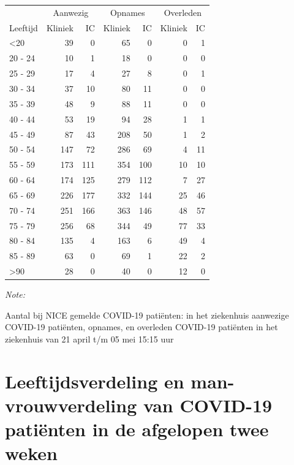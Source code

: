 \documentclass[
  english,
  man,floatsintext]{apa6}
\begin{document}
\begin{table}
\centering\begingroup\fontsize{10}{12}\selectfont

\begin{threeparttable}
\begin{tabular}{lrrrrrr}
\toprule
\multicolumn{1}{c}{ } & \multicolumn{2}{c}{Aanwezig} & \multicolumn{2}{c}{Opnames} & \multicolumn{2}{c}{Overleden} \\
\cmidrule(l{3pt}r{3pt}){2-3} \cmidrule(l{3pt}r{3pt}){4-5} \cmidrule(l{3pt}r{3pt}){6-7}
Leeftijd & Kliniek & IC & Kliniek & IC & Kliniek & IC\\
\midrule
<20 & 39 & 0 & 65 & 0 & 0 & 1\\
20 - 24 & 10 & 1 & 18 & 0 & 0 & 0\\
25 - 29 & 17 & 4 & 27 & 8 & 0 & 1\\
30 - 34 & 37 & 10 & 80 & 11 & 0 & 0\\
35 - 39 & 48 & 9 & 88 & 11 & 0 & 0\\
40 - 44 & 53 & 19 & 94 & 28 & 1 & 1\\
45 - 49 & 87 & 43 & 208 & 50 & 1 & 2\\
50 - 54 & 147 & 72 & 286 & 69 & 4 & 11\\
55 - 59 & 173 & 111 & 354 & 100 & 10 & 10\\
60 - 64 & 174 & 125 & 279 & 112 & 7 & 27\\
65 - 69 & 226 & 177 & 332 & 144 & 25 & 46\\
70 - 74 & 251 & 166 & 363 & 146 & 48 & 57\\
75 - 79 & 256 & 68 & 344 & 49 & 77 & 33\\
80 - 84 & 135 & 4 & 163 & 6 & 49 & 4\\
85 - 89 & 63 & 0 & 69 & 1 & 22 & 2\\
>90 & 28 & 0 & 40 & 0 & 12 & 0\\
\bottomrule
\end{tabular}
\begin{tablenotes}
\item \textit{Note: } 
\item Aantal bij NICE gemelde COVID-19 patiënten: in het ziekenhuis aanwezige COVID-19 patiënten, opnames, en overleden COVID-19 patiënten in het ziekenhuis van 21 april t/m 05 mei 15:15 uur
\end{tablenotes}
\end{threeparttable}
\endgroup{}
\end{table}

\newpage

\hypertarget{leeftijdsverdeling-en-man-vrouwverdeling-van-covid-19-patiuxebnten-in-de-afgelopen-twee-weken}{%
\section{Leeftijdsverdeling en man-vrouwverdeling van COVID-19 patiënten in de afgelopen twee weken}\label{leeftijdsverdeling-en-man-vrouwverdeling-van-covid-19-patiuxebnten-in-de-afgelopen-twee-weken}}
\end{document}
